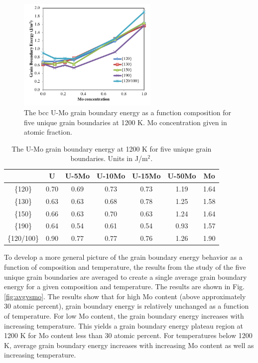 \documentclass[review]{elsarticle}
\begin{document}
\begin{figure}[h]
 \centering
 \includegraphics[width=0.6\textwidth]{uvsmo1200.png} 
 \caption{The bcc U-Mo grain boundary energy as a function composition for five unique grain boundaries at 1200 K. Mo concentration given in atomic fraction.}
 \label{fig:umo1200}
\end{figure}

\begin{table}[h]
\caption{The U-Mo grain boundary energy at 1200 K for five unique grain boundaries. Units in J/m$^{2}$. } \label{tab:umo1200}
\begin{center}
\begin{tabular}{|c|c|c|c|c|c|c|}
	\hline
 & U & U-5Mo & U-10Mo & U-15Mo & U-50Mo & Mo \\
\hline
\{120\}	 & 0.70 & 0.69 & 0.73 & 0.73 & 1.19 & 1.64 \\
\{130\}	 & 0.63 & 0.63 & 0.68 & 0.78 & 1.25 & 1.58 \\
\{150\}	 & 0.66 & 0.63 & 0.70 & 0.63 & 1.24 & 1.64 \\
\{190\}	 & 0.64 & 0.54 & 0.61 & 0.54 & 0.93 & 1.57 \\
\{120/100\} & 0.90 & 0.77 & 0.77 & 0.76 & 1.26 & 1.90 \\
 	 \hline
\end{tabular}
\end{center}
\label{default}
\end{table}

\FloatBarrier

To develop a more general picture of the grain boundary energy behavior as a function of composition and temperature, the results from the study of the five unique grain boundaries are averaged to create a single average grain boundary energy for a given composition and temperature. The results are shown in Fig. \ref{fig:avgvsmo}. The results show that for high Mo content (above approximately 30 atomic percent), grain boundary energy is relatively unchanged as a function of temperature. For low Mo content, the grain boundary energy increases with increasing temperature. This yields a grain boundary energy plateau region at 1200 K for Mo content less than 30 atomic percent. For temperatures below 1200 K, average grain boundary energy increases with increasing Mo content as well as increasing temperature. 
\end{document}
